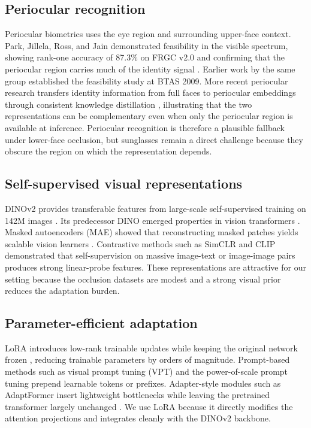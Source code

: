 ﻿\documentclass[10pt,journal,compsoc]{IEEEtran}
\begin{document}
\subsection{Periocular recognition}
Periocular biometrics uses the eye region and surrounding upper-face context. Park, Jillela, Ross, and Jain demonstrated feasibility in the visible spectrum, showing rank-one accuracy of 87.3\% on FRGC v2.0 and confirming that the periocular region carries much of the identity signal \cite{periocular}. Earlier work by the same group established the feasibility study at BTAS 2009. More recent periocular research transfers identity information from full faces to periocular embeddings through consistent knowledge distillation \cite{ckd2024}, illustrating that the two representations can be complementary even when only the periocular region is available at inference. Periocular recognition is therefore a plausible fallback under lower-face occlusion, but sunglasses remain a direct challenge because they obscure the region on which the representation depends.

\subsection{Self-supervised visual representations}
DINOv2 provides transferable features from large-scale self-supervised training on 142M images \cite{dinov2}. Its predecessor DINO emerged properties in vision transformers \cite{dino}. Masked autoencoders (MAE) showed that reconstructing masked patches yields scalable vision learners \cite{mae}. Contrastive methods such as SimCLR \cite{simclr} and CLIP \cite{clip} demonstrated that self-supervision on massive image-text or image-image pairs produces strong linear-probe features. These representations are attractive for our setting because the occlusion datasets are modest and a strong visual prior reduces the adaptation burden.

\subsection{Parameter-efficient adaptation}
LoRA introduces low-rank trainable updates while keeping the original network frozen \cite{lora}, reducing trainable parameters by orders of magnitude. Prompt-based methods such as visual prompt tuning (VPT) \cite{vpt} and the power-of-scale prompt tuning \cite{prompt} prepend learnable tokens or prefixes. Adapter-style modules such as AdaptFormer insert lightweight bottlenecks while leaving the pretrained transformer largely unchanged \cite{adaptformer}. We use LoRA because it directly modifies the attention projections and integrates cleanly with the DINOv2 backbone.
\end{document}
